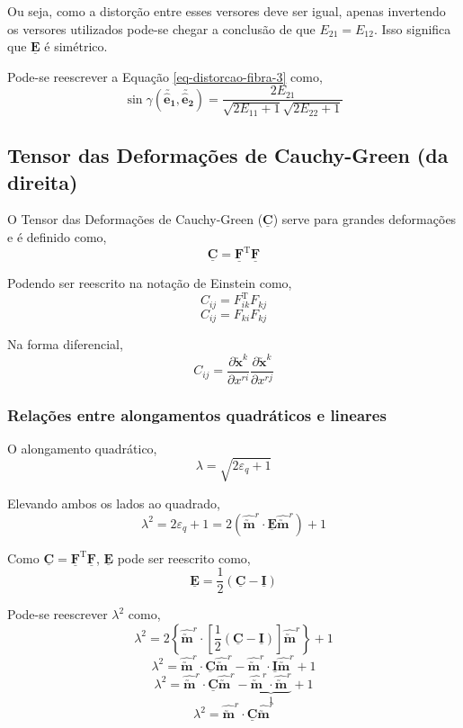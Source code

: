 	Ou seja, como a distorção entre esses versores deve ser igual, apenas invertendo os versores utilizados pode-se chegar a conclusão de que $E_{21}=E_{12}$. Isso significa que $\underline{\mathbf{E}}$ é simétrico.
	
	Pode-se reescrever a Equação \eqref{eq-distorcao-fibra-3} como,
	\[\sin\gamma(\utilde{\mathbf{\hat{e}_1}},\utilde{\mathbf{\hat{e}_2}})=\frac{2E_{21}}{\displaystyle\sqrt{2E_{11}+1}\sqrt{2E_{22}+1}}\]
	
	\subsection{Tensor das Deformações de Cauchy-Green (da direita)}
	
	O Tensor das Deformações de Cauchy-Green ($\underline{\mathbf{C}}$) serve para grandes deformações e é definido como,
	\begin{equation}\label{eq-def-cauchy-green}
		\underline{\mathbf{C}}=\underline{\mathbf{F}}^{\text{T}}\underline{\mathbf{F}}
	\end{equation}
	
	Podendo ser reescrito na notação de Einstein como,
	\[C_{ij}=F_{ik}^{\text{T}}F_{kj}\]
	\[C_{ij}=F_{ki}F_{kj}\]
	
	Na forma diferencial,
	\[C_{ij}=\frac{\partial \utilde{\mathbf{x}}^k}{\partial x^{ri}}\frac{\partial \utilde{\mathbf{x}}^k}{\partial x^{rj}}\]
	
	\subsubsection{Relações entre alongamentos quadráticos e lineares}
	
	O alongamento quadrático,
	\[\lambda=\sqrt{2\varepsilon_q+1}\]
	
	Elevando ambos os lados ao quadrado,
	\[\lambda^2=2\varepsilon_q+1=2(\hat{\utilde{\mathbf{m}}}^r\cdot\underline{\mathbf{E}}\hat{\utilde{\mathbf{m}}}^r)+1\]
	
	Como $\underline{\mathbf{C}}=\underline{\mathbf{F}}^{\text{T}}\underline{\mathbf{F}}$, $\underline{\mathbf{E}}$ pode ser reescrito como,
	\begin{equation}\label{eq-green-lagrange-em-funcao-de-cauchy-green}
		\underline{\mathbf{E}}=\frac{1}{2}(\underline{\mathbf{C}}-\underline{\mathbf{I}})
	\end{equation}
	
	Pode-se reescrever $\lambda^2$ como,
	\[\lambda^2=2\left\{\hat{\utilde{\mathbf{m}}}^r\cdot\left[\frac{1}{2}(\underline{\mathbf{C}}-\underline{\mathbf{I}})\right]\hat{\utilde{\mathbf{m}}}^r\right\}+1\]
	\[\lambda^2=\hat{\utilde{\mathbf{m}}}^r\cdot\underline{\mathbf{C}}\hat{\utilde{\mathbf{m}}}^r-\hat{\utilde{\mathbf{m}}}^r\cdot\underline{\mathbf{I}}\hat{\utilde{\mathbf{m}}}^r+1\]
	\[\lambda^2=\hat{\utilde{\mathbf{m}}}^r\cdot\underline{\mathbf{C}}\hat{\utilde{\mathbf{m}}}^r-\underbrace{\hat{\utilde{\mathbf{m}}}^r\cdot\hat{\utilde{\mathbf{m}}}^r}_{\displaystyle1}+1\]
	\[\lambda^2=\hat{\utilde{\mathbf{m}}}^r\cdot\underline{\mathbf{C}}\hat{\utilde{\mathbf{m}}}^r\]
	
